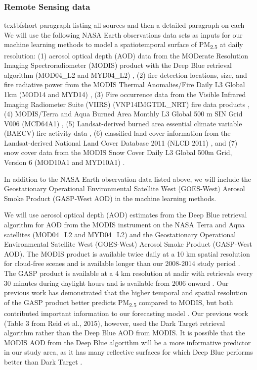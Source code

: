 \documentclass[authoryear]{elsarticle}
\begin{document}
\subsubsection{Remote Sensing data} %
textbf{short paragraph listing all sources and then a detailed paragraph on each}
We will use the following NASA Earth observations data sets as inputs for our machine learning methods to model a spatiotemporal surface of PM\textsubscript{2.5} at daily resolution: 
(1) aerosol optical depth (AOD) data from the MODerate Resolution Imaging Spectroradiometer (MODIS) product with the Deep Blue retrieval algorithm (MOD04\_L2 and MYD04\_L2) \citep{Sayer2013}, 
(2) fire detection locations, size, and fire radiative power from the MODIS Thermal Anomalies/Fire Daily L3 Global 1km (MOD14 and MYD14) \citep{Giglio2006}, 
(3) Fire occurrence data from the Visible Infrared Imaging Radiometer Suite (VIIRS) (VNP14IMGTDL\_NRT) fire data products \citep{Schroeder2014}, 
(4) MODIS/Terra and Aqua Burned Area Monthly L3 Global 500 m SIN Grid V006 (MCD64A1) \citep{MODISBurnArea}, 
(5) Landsat-derived burned area essential climate variable (BAECV) fire activity data \citep{Hawbaker2017}, 
(6) classified land cover information from the Landsat-derived National Land Cover Database 2011 (NLCD 2011) \citep{Homer2017}, and 
(7) snow cover data from the MODIS Snow Cover Daily L3 Global 500m Grid, Version 6 (MOD10A1 and MYD10A1) \citep{Hall2016}.

In addition to the NASA Earth observation data listed above, we will include the Geostationary Operational Environmental Satellite West (GOES-West) Aerosol Smoke Product (GASP-West AOD) \citep{GASPAerosolProduct2017} in the machine learning methods. 

We will use aerosol optical depth (AOD) estimates from the Deep Blue retrieval algorithm for AOD from the MODIS instrument on the NASA Terra and Aqua satellites (MOD04\_L2 and MYD04\_L2) \citep{Sayer2013} and the Geostationary Operational Environmental Satellite West (GOES-West) Aerosol Smoke Product (GASP-West AOD). The MODIS product is available twice daily at a 10 km spatial resolution for cloud-free scenes and is available longer than our 2008-2014 study period \citep{MODISMOD04L22017,MODISMYD04L22017}. The GASP product is available at a 4 km resolution at nadir with retrievals every 30 minutes during daylight hours and is available from 2006 onward 
\citep{GASPAerosolProduct2017}. Our previous work has demonstrated that the higher temporal and spatial resolution of the GASP product better predicts PM\textsubscript{2.5} compared to MODIS, but both contributed important information to our forecasting model \citep{Reid2015}. Our previous work (Table 3 from Reid et al., 2015), however, used the Dark Target retrieval algorithm rather than the Deep Blue AOD from MODIS. It is possible that the MODIS AOD from the Deep Blue algorithm will be a more informative predictor in our study area, as it has many reflective surfaces for which Deep Blue performs better than Dark Target \citep{NASADarkTarget2017}. 
\end{document}

